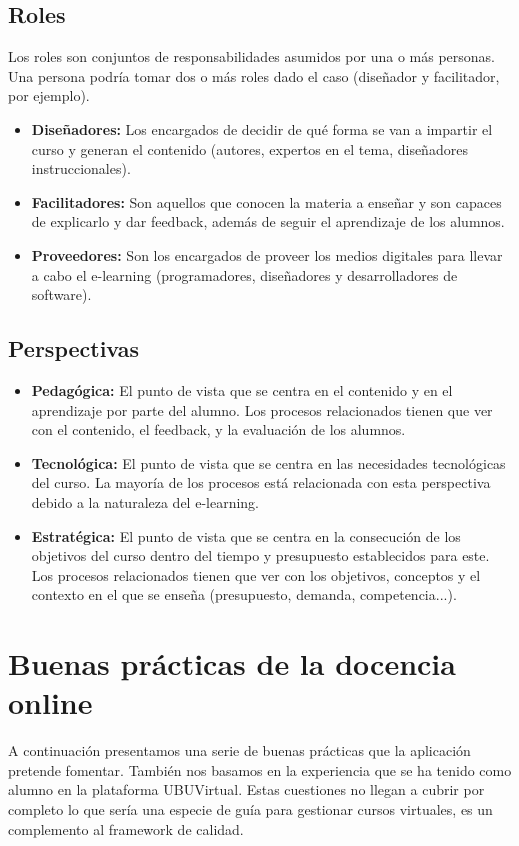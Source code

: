 \subsection{Roles}
Los roles son conjuntos de responsabilidades asumidos por una o más personas. Una persona podría tomar dos o más roles dado el caso (diseñador y facilitador, por ejemplo).
\begin{itemize}
	\item \textbf{Diseñadores:}
	Los encargados de decidir de qué forma se van a impartir el curso y generan el contenido (autores, expertos en el tema, diseñadores instruccionales).
	\item \textbf{Facilitadores:}
	Son aquellos que conocen la materia a enseñar y son capaces de explicarlo y dar feedback, además de seguir el aprendizaje de los alumnos.
	\item \textbf{Proveedores:}
	Son los encargados de proveer los medios digitales para llevar a cabo el e-learning (programadores, diseñadores y desarrolladores de software).
\end{itemize}


\subsection{Perspectivas}
\begin{itemize}
	\item \textbf{Pedagógica:}
	El punto de vista que se centra en el contenido y en el aprendizaje por parte del alumno. Los procesos relacionados tienen que ver con el contenido, el feedback, y la evaluación de los alumnos.
	\item \textbf{Tecnológica:}
	El punto de vista que se centra en las necesidades tecnológicas del curso. La mayoría de los procesos está relacionada con esta perspectiva debido a la naturaleza del e-learning.
	\item \textbf{Estratégica:}
	El punto de vista que se centra en la consecución de los objetivos del curso dentro del tiempo y presupuesto establecidos para este. Los procesos relacionados tienen que ver con los objetivos, conceptos y el contexto en el que se enseña (presupuesto, demanda, competencia...).
\end{itemize}

\section{Buenas prácticas de la docencia online}
A continuación presentamos una serie de buenas prácticas que la aplicación pretende fomentar. También nos basamos en la experiencia que se ha tenido como alumno en la plataforma UBUVirtual. Estas cuestiones no llegan a cubrir por completo lo que sería una especie de guía para gestionar cursos virtuales, es un complemento al framework de calidad.
